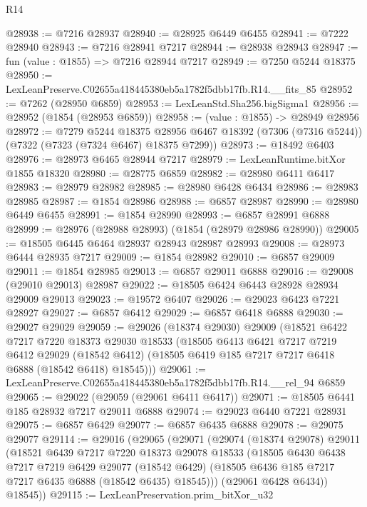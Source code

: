 \begin{lexlean}{R14}
\begin{coremodule}
@28938 := @7216 @28937
@28940 := @28925 @6449 @6455
@28941 := @7222 @28940
@28943 := @7216 @28941 @7217
@28944 := @28938 @28943
@28947 := fun (value : @1855) => @7216 @28944 @7217
@28949 := @7250 @5244 @18375
@28950 := LexLeanPreserve.C02655a418445380eb5a1782f5dbb17fb.R14.__fits_85
@28952 := @7262 (@28950 @6859)
@28953 := LexLeanStd.Sha256.bigSigma1
@28956 := @28952 (@1854 (@28953 @6859))
@28958 := (value : @1855) -> @28949 @28956
@28972 := @7279
    @5244
    @18375
    @28956
    @6467
    @18392
    (@7306 (@7316 @5244))
    (@7322 (@7323 (@7324 @6467) @18375 @7299))
@28973 := @18492 @6403
@28976 := @28973 @6465 @28944 @7217
@28979 := LexLeanRuntime.bitXor @1855 @18320
@28980 := @28775 @6859
@28982 := @28980 @6411 @6417
@28983 := @28979 @28982
@28985 := @28980 @6428 @6434
@28986 := @28983 @28985
@28987 := @1854 @28986
@28988 := @6857 @28987
@28990 := @28980 @6449 @6455
@28991 := @1854 @28990
@28993 := @6857 @28991 @6888
@28999 := @28976 (@28988 @28993) (@1854 (@28979 @28986 @28990))
@29005 := @18505 @6445 @6464 @28937 @28943 @28987 @28993
@29008 := @28973 @6444 @28935 @7217
@29009 := @1854 @28982
@29010 := @6857 @29009
@29011 := @1854 @28985
@29013 := @6857 @29011 @6888
@29016 := @29008 (@29010 @29013) @28987
@29022 := @18505 @6424 @6443 @28928 @28934 @29009 @29013
@29023 := @19572 @6407
@29026 := @29023 @6423 @7221 @28927
@29027 := @6857 @6412
@29029 := @6857 @6418 @6888
@29030 := @29027 @29029
@29059 := @29026
    (@18374 @29030)
    @29009
    (@18521
      @6422
      @7217
      @7220
      @18373
      @29030
      @18533
      (@18505
        @6413
        @6421
        @7217
        @7219
        @6412
        @29029
        (@18542 @6412)
        (@18505 @6419 @185 @7217 @7217 @6418 @6888 (@18542 @6418) @18545)))
@29061 := LexLeanPreserve.C02655a418445380eb5a1782f5dbb17fb.R14.__rel_94 @6859
@29065 := @29022 (@29059 (@29061 @6411 @6417))
@29071 := @18505 @6441 @185 @28932 @7217 @29011 @6888
@29074 := @29023 @6440 @7221 @28931
@29075 := @6857 @6429
@29077 := @6857 @6435 @6888
@29078 := @29075 @29077
@29114 := @29016
    (@29065
      (@29071
        (@29074
          (@18374 @29078)
          @29011
          (@18521
            @6439
            @7217
            @7220
            @18373
            @29078
            @18533
            (@18505
              @6430
              @6438
              @7217
              @7219
              @6429
              @29077
              (@18542 @6429)
              (@18505 @6436 @185 @7217 @7217 @6435 @6888 (@18542 @6435) @18545)))
          (@29061 @6428 @6434))
        @18545))
@29115 := LexLeanPreservation.prim_bitXor_u32

\end{coremodule}
\end{lexlean}
